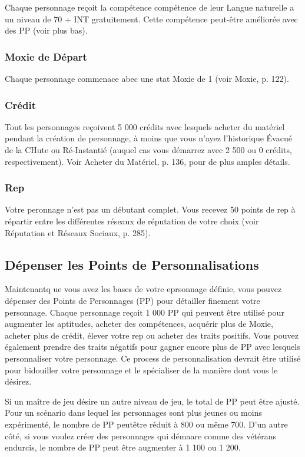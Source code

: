 Chaque personnage reçoit la compétence compétence de leur Langue naturelle a un niveau de 70 + INT gratuitement. Cette compétence peut-être améliorée avec des PP (voir plus bas). 

\subsubsection{Moxie de Départ} \label{sec:starting-moxie} 

Chaque personnage commenace abec une stat Moxie de 1 (voir Moxie, p. 122). 

\subsubsection{Crédit} \label{sec:starting-credit} 

Tout les personnages reçoivent 5 000 crédits avec lesquels acheter du matériel pendant la création de personnage, à moins que vous n'ayez l'historique Évacué de la CHute ou Ré-Instantié (auquel cas vous démarrez avec 2 500 ou 0 crédits, respectivement). Voir Acheter du Matériel, p. 136, pour de plus amples détails. 

\subsubsection{Rep} \label{sec:starting-rep} Votre peronnage n'est pas un débutant complet. Vous recevez 50 points de rep à répartir entre les différentes réseaux de réputation de votre choix (voir Réputation et Réseaux Sociaux, p. 285). 

\subsection{Dépenser les Points de Personnalisations} \label{sec:spend-customization-points} Maintenantq ue vous avez les bases de votre eprsonnage définie, vous pouvez dépenser des Points de Personnages (PP) pour détailler finement votre personnage. Chaque personnage reçoit 1 000 PP qui peuvent être utilisé pour augmenter les aptitudes, acheter des compétences, acquérir plus de Moxie, acheter plus de crédit, élever votre rep ou acheter des traits positifs. Vous pouvez également prendre des traits négatifs pour gagner encore plus de PP avec lesquels personnaliser votre personnage. Ce process de personnalisation devrait être utilisé pour bidouiller votre personnage et le spécialiser de la manière dont vous le désirez. 

Si un maître de jeu désire un autre niveau de jeu, le total de PP peut être ajusté. Pour un scénario dans lequel les personnages sont plus jeunes ou moins expérimenté, le nombre de PP peutêtre réduit à 800 ou même 700. D'un autre côté, si vous voulez créer des personnages qui démaare comme des vétérans endurcis, le nombre de PP peut être augmenter à 1 100 ou 1 200. 

